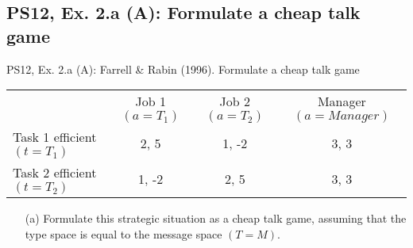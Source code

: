 \subsection{PS12, Ex. 2.a (A): Formulate a cheap talk game}

\begin{frame}{PS12, Ex. 2.a (A): Farrell \& Rabin (1996). Formulate a cheap talk game}
    \begin{table}
      \begin{tabular}{l|c|c|c|}
          \multicolumn{1}{c}{} & \multicolumn{1}{c}{Job 1 $(a=T_1)$} & \multicolumn{1}{c}{Job 2 $(a=T_2)$} & \multicolumn{1}{c}{Manager $(a=Manager)$} \\\cline{2-4}
           Task 1 efficient $(t=T_1)$ & 2, 5 & 1, -2 & 3, 3 \\\cline{2-4}
           Task 2 efficient $(t=T_2)$ & 1, -2 & 2, 5 & 3, 3 \\\cline{2-4}
      \end{tabular}
    \end{table}\vspace{-12pt}
    \begin{itemize}
      \item[(a)] Formulate this strategic situation as a cheap talk game, assuming that the type space is equal to the message space $(T = M)$.
    \end{itemize}\vspace{-6pt}
    \vfill\null
\end{frame}

